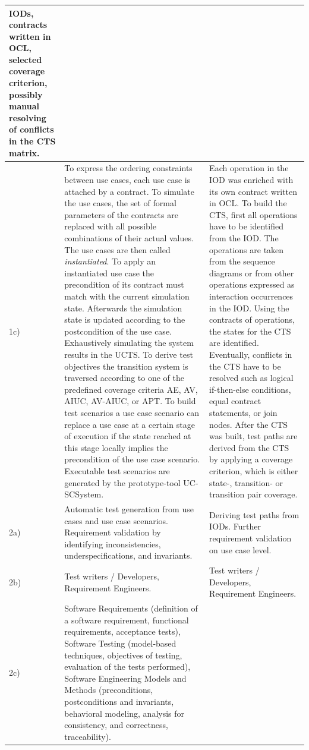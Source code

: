 \begin{small}
\begin{longtable}[h]{p{0.45cm}|p{}|p{}}
	IODs, contracts written in OCL, selected coverage criterion, possibly manual resolving of conflicts in the CTS matrix. \\
	\hline
	1c) &
	To express the ordering constraints between use cases, each use case is attached by a contract. To simulate the use cases, the set of formal parameters of the contracts are replaced with all possible combinations of their actual values. The use cases are then called \textit{instantiated}. To apply an instantiated use case the precondition of its contract must match with the current simulation state. Afterwards the simulation state is updated according to the postcondition of the use case. Exhaustively simulating the system results in the UCTS. To derive test objectives the transition system is traversed according to one of the predefined coverage criteria AE, AV, AIUC, AV-AIUC, or APT. To build test scenarios a use case scenario can replace a use case at a certain stage of execution if the state reached at this stage locally implies the precondition of the use case scenario. Executable test scenarios are generated by the prototype-tool UC-SCSystem. &
	Each operation in the IOD was enriched with its own contract written in OCL. To build the CTS, first all operations have to be identified from the IOD. The operations are taken from the sequence diagrams or from other operations expressed as interaction occurrences in the IOD. Using the contracts of operations, the states for the CTS are identified. Eventually, conflicts in the CTS have to be resolved such as logical if-then-else conditions, equal contract statements, or join nodes. After the CTS was built, test paths are derived from the CTS by applying a coverage criterion, which is either state-, transition- or transition pair coverage. \\
	\hline
	2a) & 
	Automatic test generation from use cases and use case scenarios. Requirement validation by identifying inconsistencies, underspecifications, and invariants. & 
	Deriving test paths from IODs. Further requirement validation on use case level.\\
	\hline
	2b) & 
	Test writers / Developers, Requirement Engineers. &
	Test writers / Developers, Requirement Engineers. \\
	\hline
	2c) &
	Software Requirements (definition of a software requirement, functional requirements, acceptance tests), Software Testing (model-based techniques, objectives of testing, evaluation of the tests performed), Software Engineering Models and Methods (preconditions, postconditions and invariants, behavioral modeling, analysis for consistency, and correctness, traceability). &

\end{longtable}
\end{small}
